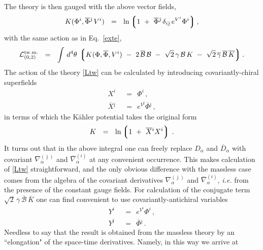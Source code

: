 \documentclass[12pt]{article}
\def\beq{\begin{equation}}
\def\eeq{\end{equation}}
\newcommand{\ov}{\overline}
\newcommand{\mc}[1]{\mathcal{#1}}
\newcommand{\lgr}{\left\lgroup}
\newcommand{\rgr}{\right\rgroup}
\newcommand{\bj}{{\bar \jmath}}
\begin{document}
	The theory is then gauged with the above vector fields,
\[
	K(\Phi^i, \ov{\Phi}{}^\bj\, V^i) ~~=~~
		\ln \lgr 1 ~+~ \ov{\Phi}{}^\bj\, \delta_{i\bj}\, e^{V^i} \Phi^i \rgr ,
\]	
	with the same action as in Eq.~\eqref{exte},
\beq
\label{Ltw}
	\mc{L}_{(0,2)}^\text{tw.m.} ~~=~~ \int\, d^4\theta\, \lgr K(\Phi,\ov{\Phi}, V^i) 
		~-~ 2\, \ov{\mc{B}}\,\mc{B}  
		~-~  \sqrt{2}\, \gamma\,\mc{B}\,K  ~-~ \sqrt{2}\, \ov{\gamma}\,\ov{\mc{B}}\,\ov{K} \rgr.
\eeq
	The action of the theory \eqref{Ltw} can be calculated by introducing covariantly-chiral superfields
\begin{align*}
%
	X^i & ~~=~~ \Phi^i\,, \\
%
	\ov{X}{}^\bj & ~~=~~ e^{V^\bj} \ov{\Phi}{}^\bj\,,
\end{align*}
	in terms of which the K\"{a}hler potential takes the original form
\[
	K ~~=~~ \ln \lgr 1 ~+~ \ov{X}{}^i X^i \rgr\,.
\]
	It turns out that in the above integral one can freely replace $ D_\alpha $ and $ \ov{D}{}_\alpha $ with
	covariant $ \nabla^{(\bj)}_\alpha $ and $ \ov{\nabla}{}^{(i)}_\alpha $ at any convenient occurrence.
	This makes calculation of \eqref{Ltw} straightforward, and the only obvious difference with the massless
	case comes from the algebra of the covariant derivatives $ \nabla^{(\bj)}_\alpha $ and 
	$ \ov{\nabla}{}^{(i)}_\alpha $, {\it i.e.} from the presence of the constant gauge fields.
	For calculation of the conjugate term $ \sqrt{2}\, \ov{\gamma}\,\ov{\mc{B}}\,\ov{K} $ one can find convenient to 
	use covariantly-antichiral variables
\begin{align*}
%
	Y^i & ~~=~~ e^{V^i} \Phi^i\,, \\
%
	Y^\bj & ~~=~~ \ov{\Phi}{}^\bj\,.
\end{align*}
	Needless to say that the result is obtained from the massless theory by an ``elongation" 
	of the space-time derivatives. Namely, in this way we arrive at
\end{document}
